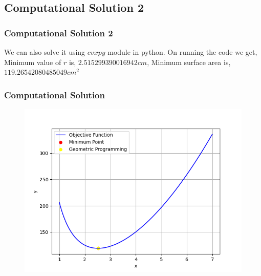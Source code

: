\documentclass{beamer}
\theoremstyle{remark}
\numberwithin{equation}{section}
\begin{document}
    \subsection{Computational Solution 2}
		\begin{frame}[fragile]
			\frametitle{Computational Solution 2}
We can also solve it using $cvxpy$ module in python. On running the code we get,\newline
Minimum value of $r$ is, $2.515299390016942 cm$, \newline Minimum surface area is, $ 119.26542080485049 cm^2$    
    \end{frame}
		\begin{frame}[fragile]
			\frametitle{Computational Solution}
			\begin{figure}[h!]
				\centering
				\includegraphics[width=1\columnwidth]{figs/fig.png}
				\label{stemplot}
			\end{figure}
	\end{frame}
	
\end{document}
